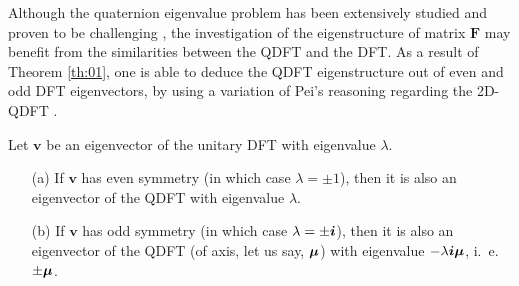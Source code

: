 Although the quaternion eigenvalue problem has been extensively studied and proven to be challenging \cite{de2002quaternionic,flaut2002eigenvalues,jiang2004algorithm,farid2011eigenvalues}, the investigation of the eigenstructure of matrix $ \mathbf{F} $ may benefit from the similarities between the QDFT and the DFT. As a result of Theorem \ref{th:01}, one is able to deduce the QDFT eigenstructure out of even and odd DFT eigenvectors, by using a variation of Pei's reasoning regarding the 2D-QDFT \cite{pei2010eigenfunctions}.

\begin{theorem}
\label{th:01}
Let $ \mathbf{v} $ be an eigenvector of the unitary DFT with eigenvalue $ \lambda $.
\begin{itemize}
\item[(a)] If $ \mathbf{v} $ has even symmetry (in which case $ \lambda = \pm 1 $), then it is also an eigenvector of the QDFT with eigenvalue $ \lambda $.
\item[(b)] If $ \mathbf{v} $ has odd symmetry (in which case $ \lambda = \pm \boldsymbol{i} $), then it is also an eigenvector of the QDFT (of axis, let us say, $ \boldsymbol{\mu} $) with eigenvalue $ -\lambda \boldsymbol{i} \boldsymbol{\mu}$, i.~e. $ \pm \boldsymbol{\mu} $.
\end{itemize}
\end{theorem}

